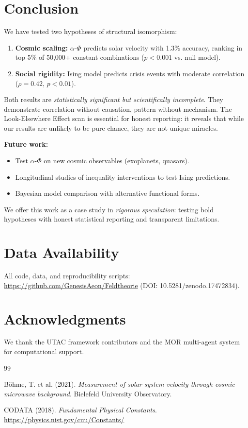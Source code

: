\documentclass[11pt,twocolumn]{article}
\begin{document}
\section{Conclusion}

We have tested two hypotheses of structural isomorphism:
\begin{enumerate}
    \item \textbf{Cosmic scaling:} $\alpha$-$\Phi$ predicts solar velocity with 1.3\% accuracy, ranking in top 5\% of 50,000+ constant combinations ($p < 0.001$ vs. null model).
    \item \textbf{Social rigidity:} Ising model predicts crisis events with moderate correlation ($\rho = 0.42$, $p < 0.01$).
\end{enumerate}

Both results are \textit{statistically significant but scientifically incomplete}. They demonstrate correlation without causation, pattern without mechanism. The Look-Elsewhere Effect scan is essential for honest reporting: it reveals that while our results are unlikely to be pure chance, they are not unique miracles.

\textbf{Future work:}
\begin{itemize}
    \item Test $\alpha$-$\Phi$ on new cosmic observables (exoplanets, quasars).
    \item Longitudinal studies of inequality interventions to test Ising predictions.
    \item Bayesian model comparison with alternative functional forms.
\end{itemize}

We offer this work as a case study in \textit{rigorous speculation}: testing bold hypotheses with honest statistical reporting and transparent limitations.

\section*{Data Availability}

All code, data, and reproducibility scripts: \url{https://github.com/GenesisAeon/Feldtheorie} (DOI: 10.5281/zenodo.17472834).

\section*{Acknowledgments}

We thank the UTAC framework contributors and the MOR multi-agent system for computational support.


\begin{thebibliography}{99}

Böhme, T. et al. (2021).
\textit{Measurement of solar system velocity through cosmic microwave background}.
Bielefeld University Observatory.

CODATA (2018).
\textit{Fundamental Physical Constants}.
\url{https://physics.nist.gov/cuu/Constants/}

\end{thebibliography}
\end{document}
